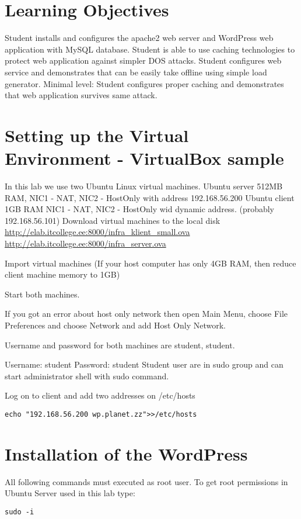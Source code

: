 \section{Learning Objectives}
Student installs and configures the apache2 web server and WordPress web application with \gls{MySQL} database.
Student is able to use caching technologies to protect web application against simpler DOS attacks. Student configures web service and demonstrates that can be
easily take offline using simple load generator. Minimal level: Student configures
proper caching and demonstrates that web application survives same attack.
\section{Setting up the Virtual Environment - VirtualBox sample}
In this lab we use two Ubuntu Linux virtual machines.
Ubuntu server 512MB RAM, NIC1 - NAT, NIC2 - HostOnly with address 192.168.56.200
Ubuntu client 1GB RAM NIC1 - NAT, NIC2 - HostOnly wid dynamic address. (probably 192.168.56.101)
Download virtual machines to the local disk
\url{http://elab.itcollege.ee:8000/infra_klient_small.ova}
\url{http://elab.itcollege.ee:8000/infra_server.ova}

Import virtual machines (If your host computer has only 4GB RAM, then reduce client machine memory to 1GB)

Start both machines. 

{\small{If you got an error about host only network then open Main Menu, choose File Preferences and choose Network and add Host Only Network.}}

Username and password for both machines are student, student.

Username: student
Password: student
Student user are in sudo group and can start administrator shell with sudo command.

Log on to client and add two addresses on /etc/hosts
\begin{verbatim}
echo "192.168.56.200 wp.planet.zz">>/etc/hosts
\end{verbatim}

\section{Installation of the WordPress}
All following commands must executed as root user. To get root permissions in Ubuntu Server used in this lab type:


\begin{verbatim}
sudo -i
\end{verbatim}



